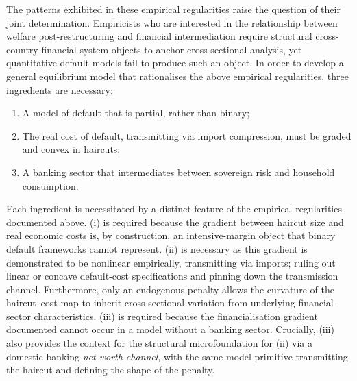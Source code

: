 \documentclass[11pt]{article}
\theoremstyle{definition}
\theoremstyle{plain}
\theoremstyle{remark}
\begin{document}
The patterns exhibited in these empirical regularities raise the question of their joint determination. Empiricists who are interested in the relationship between welfare post-restructuring and financial intermediation require structural cross-country financial-system objects to anchor cross-sectional analysis, yet quantitative default models fail to produce such an object. In order to develop a general equilibrium model that rationalises the above empirical regularities, three ingredients are necessary:

\begin{enumerate} [label=\roman*]
    \item A model of default that is partial, rather than binary;
    \item The real cost of default, transmitting via import compression, must be graded and convex in haircuts;
    \item A banking sector that intermediates between sovereign risk and household consumption.
\end{enumerate}

Each ingredient is necessitated by a distinct feature of the empirical regularities documented above. (i) is required because the gradient between haircut size and real economic costs is, by construction, an intensive-margin object that binary default frameworks cannot represent. (ii) is necessary as this gradient is demonstrated to be nonlinear empirically, transmitting via imports; ruling out linear or concave default-cost specifications and pinning down the transmission channel. Furthermore, only an endogenous penalty allows the curvature of the haircut–cost map to inherit cross-sectional variation from underlying financial-sector characteristics. (iii) is required because the financialisation gradient documented cannot occur in a model without a banking sector. Crucially, (iii) also provides the context for the structural microfoundation for (ii) via a domestic banking \textit{net-worth channel}, with the same model primitive transmitting the haircut and defining the shape of the penalty.
\end{document}
